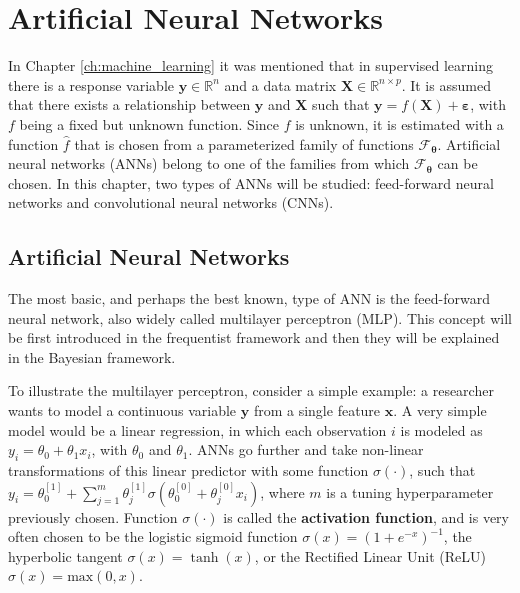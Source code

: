 
\chapter{Artificial Neural Networks}
\label{ch:ann}


In Chapter \ref{ch:machine_learning} it was mentioned that in supervised learning there is a response variable $\boldsymbol{y} \in \mathbb{R}^n$ and a data matrix $\boldsymbol{X} \in \mathbb{R}^{n \times p}$. It is assumed that there exists a relationship between $\boldsymbol{y}$ and $\boldsymbol{X}$ such that
$\boldsymbol{y} = f(\boldsymbol{X}) + \boldsymbol{\varepsilon}$,
with $f$ being a fixed but unknown function. Since $f$ is unknown, it is estimated with a function $\hat{f}$ that is chosen from a parameterized family of functions $\mathcal{F}_{\boldsymbol{\theta}}$. Artificial neural networks (ANNs) belong to one of the families from which $\mathcal{F}_{\boldsymbol{\theta}}$ can be chosen. In this chapter, two types of ANNs will be studied: feed-forward neural networks and convolutional neural networks (CNNs).

\section{Artificial Neural Networks}

The most basic, and perhaps the best known, type of ANN is the feed-forward neural network, also widely called multilayer perceptron (MLP). This concept will be first introduced in the frequentist framework and then they will be explained in the Bayesian framework.

To illustrate the multilayer perceptron, consider a simple example: a researcher wants to model a continuous variable $\boldsymbol{y}$ from a single feature $\boldsymbol{x}$. A very simple model would be a linear regression, in which each observation $i$ is modeled as $y_i = \theta_0 + \theta_1 x_i$, with $\theta_0$ and $\theta_1$. ANNs go further and take non-linear transformations of this linear predictor with some function $\sigma(\cdot)$,
such that $y_i = \theta_0^{[1]} +  \sum_{j = 1}^m \theta_j^{[1]} \sigma \left( \theta_0^{[0]} + \theta_j^{[0]} x_i \right)$,
where $m$ is a tuning hyperparameter previously chosen.
Function $\sigma(\cdot)$ is called the \textbf{activation function}, and is very often chosen to be the logistic sigmoid function $\sigma(x) = (1 + e^{-x})^{-1}$,
the hyperbolic tangent $\sigma(x) = \tanh(x)$,
or the Rectified Linear Unit (ReLU) $\sigma(x) = \mathrm{max}(0, x)$.


